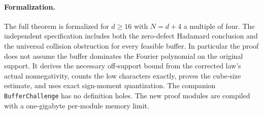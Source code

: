 \paragraph{Formalization.}
The full theorem is formalized for $d\ge16$ with $N=d+4$ a multiple
of four. The independent specification includes both the zero-defect
Hadamard conclusion and the universal collision obstruction for every
feasible buffer. In particular the proof does not assume the buffer
dominates the Fourier polynomial on the original support. It derives
the necessary off-support bound from the corrected law's actual
nonnegativity, counts the low characters exactly, proves the cube-size
estimate, and uses exact sign-moment quantization. The companion
\texttt{BufferChallenge} has no definition holes. The new proof modules
are compiled with a one-gigabyte per-module memory limit.
